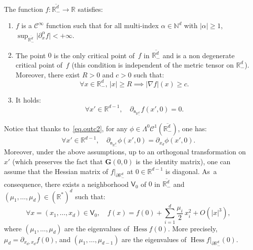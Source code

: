 \documentclass[JEP,XML,SOM,Unicode,NoEqCountersInSection,NoFloatCountersInSection,published]{cedram}
\newenvironment{enumeratei}
{\bgroup\def\theenumi{\roman{enumi}}\def\theenumii{\arabic{enumii}}\begin{enumerate}}
{\end{enumerate}\egroup}
\newcommand{\mbf}[1]{\mathbf{#1}}
\let\pa\partial
\DeclareMathOperator{\hess}{Hess}\let\Hess\hess
\theoremstyle{plain}
\theoremstyle{definition}
\newenvironment{manualassumption}[1]{%
\renewcommand\themanualassumptioninner{#1}%
\manualassumptioninner}{\endmanualassumptioninner}
\begin{document}
\begin{manualassumption}{$(\textup{Potential-}\mathbb R^{d}_-)$}\label{PotentialRd-}
The function $f:\overline{\mathbb R^{d}_-}\to \mathbb R$ satisfies: \begin{enumeratei}
\item\label{PotentialRd-i}
$f$ is a $\mathcal C^\infty$ function such that for all multi-index $\alpha \in \mathbb N^d$ with $\vert \alpha\vert \ge 1$, $\sup_{\overline{\mathbb R^d_-}}\vert \partial_x^\alpha f\vert<+\infty$.
\item\label{PotentialRd-ii}
The point $0$ is the only critical point of~$f$ in $\overline{\mathbb R^d_-}$ and is a non degenerate critical point of~$f$ (this condition is independent of the metric tensor on $\mathbb R^{d}_-$). Moreover, there exist $R>0$ and $c>0$ such that:
\begin{equation}\label{eq.grad>0}
\forall x \in \mathbb R^d_-, \, \vert x \vert \ge R \implies \vert \nabla f\vert (x)\ge c.
\end{equation}

\item\label{PotentialRd-iii}
It holds:
\begin{equation}\label{eq.stable}
\forall x'\in \mathbb R^{d-1}, \quad \partial_{\mathsf n_{\mathbb R^d_-}}f(x',0)=0.
\end{equation}
\end{enumeratei}
\end{manualassumption}

Notice that thanks to~\eqref{eq.outc2}, for any $\phi \in
\Lambda^0\mathcal C^1(\overline{\mathbb R^d_-})$, one has:
\begin{equation}\label{eq.dec-gradient-phi}
\forall x'\in \mathbb R^{d-1},\quad \partial_{\mathsf n_{\mathbb R_-^d} }\phi (x',0)=\partial_{x_d}\phi(x',0).
\end{equation}
Moreover, under the above assumptions, up to an orthogonal transformation
on $x'$ (which preserves the fact that $\mbf G(0,0)$ is the identity matrix), one can assume that the Hessian
matrix of $f|_{\pa \mathbb R^{d}_-}$ at $0\in \mathbb R^{d-1}$ is
diagonal. As~a consequence, there exists a neighborhood $\mathsf V_0$ of $0$ in $\overline{\mathbb R^d_-}$ and $(\mu_1,\ldots,\mu_{d})\in (\mathbb R^*)^d$ such that:
\begin{equation}\label{eq.decf}
\forall x=(x_1,\ldots,x_d)\in \mathsf V_0,\quad f(x)= f(0)+
\sum_{i=1}^d \frac{\mu_i}{2}\, x_i^2 +O(|x|^3),
\end{equation}
where $(\mu_1, \ldots, \mu_d)$ are the eigenvalues of $\hess
f(0)$. More precisely, $\mu_d=\partial_{x_d,x_d} f(0)$, and
$(\mu_1,\ldots,\mu_{d-1})$ are the eigenvalues of $\hess f|_{\pa \mathbb R^{d}_-}(0)$.
\end{document}
